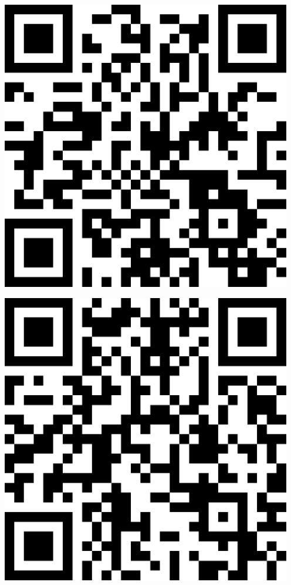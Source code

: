 \documentclass[letterpaper]{article}
\begin{document}
 \endgroup 
 \vspace*{\fill} 
 \pagebreak 
{} 
 \vspace*{\fill} 
 \begingroup 
 \centerline{\includegraphics[scale=1,width=5in,height=5in]{Class3455.png}} 
 \endgroup 
 \vspace*{\fill} 
 \pagebreak 
{} 
 \vspace*{\fill} 
 \begingroup 
 \centerline{\includegraphics[scale=1,width=5in,height=5in]{Class3510.png}} 
\end{document}
